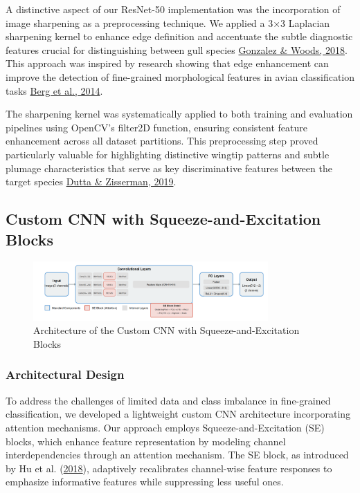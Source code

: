 \documentclass[a4paper,12pt]{report}
\begin{document}
A distinctive aspect of our ResNet-50 implementation was the incorporation of image sharpening as a preprocessing technique. We applied a 3×3 Laplacian sharpening kernel to enhance edge definition and accentuate the subtle diagnostic features crucial for distinguishing between gull species {\href{https://www.pearson.com/en-us/subject-catalog/p/digital-image-processing/P200000003546}{Gonzalez \& Woods, 2018}}. This approach was inspired by research showing that edge enhancement can improve the detection of fine-grained morphological features in avian classification tasks {\href{https://openaccess.thecvf.com/content_cvpr_2014/papers/Berg_Birdsnap_Large-scale_Fine-grained_2014_CVPR_paper.pdf}{Berg et al., 2014}}.

The sharpening kernel was systematically applied to both training and evaluation pipelines using OpenCV's filter2D function, ensuring consistent feature enhancement across all dataset partitions. This preprocessing step proved particularly valuable for highlighting distinctive wingtip patterns and subtle plumage characteristics that serve as key discriminative features between the target species {\href{https://ieeexplore.ieee.org/document/8659085}{Dutta \& Zisserman, 2019}}.

\subsection{Custom CNN with Squeeze-and-Excitation Blocks}

\begin{figure}[h]
    \centering
    \includegraphics[width=0.8\textwidth]{images/architecture/improvedcnn.png}
    \caption{Architecture of the Custom CNN with Squeeze-and-Excitation Blocks}
    \label{fig:improvedcnn_architecture}
\end{figure}

\subsubsection{Architectural Design}

To address the challenges of limited data and class imbalance in fine-grained classification, we developed a lightweight custom CNN architecture incorporating attention mechanisms. Our approach employs Squeeze-and-Excitation (SE) blocks, which enhance feature representation by modeling channel interdependencies through an attention mechanism. The SE block, as introduced by Hu et al. (\href{https://openaccess.thecvf.com/content_cvpr_2018/papers/Hu_Squeeze-and-Excitation_Networks_CVPR_2018_paper.pdf}{2018}), adaptively recalibrates channel-wise feature responses to emphasize informative features while suppressing less useful ones.
\end{document}
